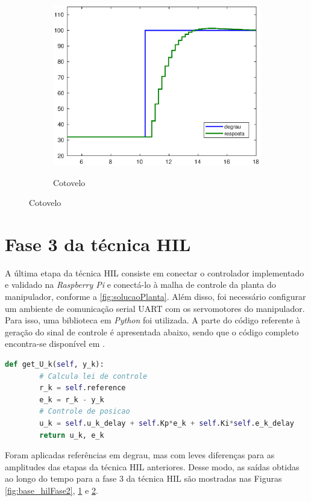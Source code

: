 \begin{figure}[h!]
\begin{subfigure}{.5\textwidth}
    \label{fig:shoulder_hilFase2}
  \end{subfigure}%
  \\[5ex]
  \begin{subfigure}{\textwidth}
    \centering
    \caption{Cotovelo}
    \includegraphics[width = 0.55\columnwidth]{Imagens/forearm_hilFase2}
    \label{fig:forearm_hilFase2}
  \end{subfigure}%
  
  \label{fig:hilFase2} 

\end{figure}

\section{Fase 3 da técnica HIL}

A última etapa da técnica HIL consiste em conectar o controlador implementado e validado 
na \textit{Raspberry Pi} e conectá-lo à malha de controle da planta do
manipulador, conforme a \autoref{fig:solucaoPlanta}. Além disso, foi necessário configurar
um ambiente de comunicação serial UART com os servomotores do manipulador. Para isso, uma
biblioteca em \textit{Python} foi utilizada. A parte do código referente à geração do sinal 
de controle é apresentada abaixo, sendo que o código completo encontra-se disponível 
em \cite{lelis_hil3}.\\[2cm]

\begin{lstlisting}[language=Python]
	def get_U_k(self, y_k):
		# Calcula lei de controle
		r_k = self.reference
		e_k = r_k - y_k
		# Controle de posicao
		u_k = self.u_k_delay + self.Kp*e_k + self.Ki*self.e_k_delay
		return u_k, e_k
\end{lstlisting}

Foram aplicadas referências em degrau, mas com leves diferenças para as amplitudes
das etapas da técnica HIL anteriores. Desse modo, as saídas obtidas ao longo do 
tempo para a fase 3 da técnica HIL são mostradas nas Figuras \ref{fig:base_hilFase2}, 
\ref{fig:shoulder_hilFase2} e \ref{fig:forearm_hilFase2}.

